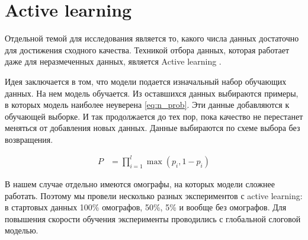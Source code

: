 \documentclass[14pt, a4paper, russian]{extreport}
\begin{document}
\section{Active learning}
Отдельной темой для исследования является то, какого числа данных достаточно для достижения сходного качества. Техникой отбора данных, которая работает даже для неразмеченных данных, является Active learning \cite{shen}.

Идея заключается в том, что модели подается изначальный набор обучающих данных. На нем модель обучается. Из оставшихся данных выбираются примеры, в которых модель наиболее неуверена \ref{eq:n_prob}. Эти данные добавляются к обучающей выборке. И так продолжается до тех пор, пока качество не перестанет меняться от добавления новых данных. Данные выбираются по схеме выбора без возвращения. 

\begin{align}
\label{eq:n_prob} P &= \prod\limits_{i=1}^l \max(p_i, 1-p_i)
\end{align}

В нашем случае отдельно имеются омографы, на которых модели сложнее работать. Поэтому мы провели несколько разных экспериментов с active learning: в стартовых данных 100\% омографов, 50\%, 5\% и вообще без омографов. Для повышения скорости обучения эксперименты проводились с  глобальной слоговой моделью. 
\end{document}
